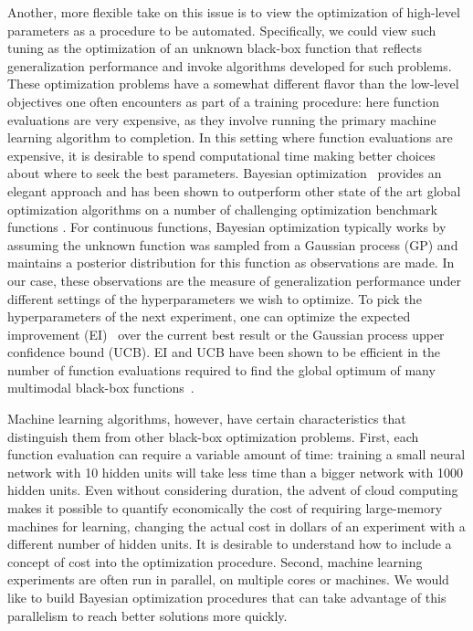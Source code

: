 \documentclass[aos,preprint]{imsart}
\begin{document}
Another, more flexible take on this issue is to view the optimization
of high-level parameters as a procedure to be automated. Specifically,
we could view such tuning as the optimization of an unknown black-box
function that reflects generalization performance and invoke
algorithms developed for such problems.  These optimization problems
have a somewhat different flavor than the low-level objectives one
often encounters as part of a training procedure: here function
evaluations are very expensive, as they involve running the primary
machine learning algorithm to completion.  In this setting where
function evaluations are expensive, it is desirable to spend
computational time making better choices about where to seek the best
parameters. Bayesian optimization~\citep{Mockus1978} provides an
elegant approach and has been shown to outperform other state of the
art global optimization algorithms on a number of challenging
optimization benchmark functions \citep{Jones2001}.  For continuous
functions, Bayesian optimization typically works by assuming the
unknown function was sampled from a Gaussian process (GP) and
maintains a posterior distribution for this function as observations
are made.  In our case, these observations are the measure of
generalization performance under different settings of the
hyperparameters we wish to optimize. To pick the hyperparameters of
the next experiment, one can optimize the expected improvement
(EI)~\citep{Mockus1978} over the current best result or the Gaussian
process upper confidence bound (UCB)\citep{Srinivas2010}. EI and UCB
have been shown to be efficient in the number of function evaluations
required to find the global optimum of many multimodal black-box
functions~\citep{Bull2011, Srinivas2010}.

Machine learning algorithms, however, have certain characteristics
that distinguish them from other black-box optimization problems.
First, each function evaluation can require a variable amount of time:
training a small neural network with 10 hidden units will take less
time than a bigger network with 1000 hidden units.  Even without
considering duration, the advent of cloud computing makes it possible
to quantify economically the cost of requiring large-memory machines
for learning, changing the actual cost in dollars of an experiment
with a different number of hidden units.  It is desirable to
understand how to include a concept of cost into the optimization
procedure.  Second, machine learning experiments are often run in
parallel, on multiple cores or machines.  We would like to build
Bayesian optimization procedures that can take advantage of this
parallelism to reach better solutions more quickly.
\end{document}
